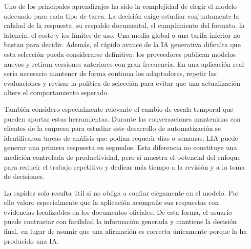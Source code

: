 Uno de los principales aprendizajes ha sido la complejidad de elegir el modelo
adecuado para cada tipo de tarea. La decisión exige estudiar conjuntamente la
calidad de la respuesta, su respaldo documental, el cumplimiento del formato,
la latencia, el coste y los límites de uso. Una media global o una tarifa
inferior no bastan para decidir. Además, el rápido avance de la IA generativa
dificulta que esta selección pueda considerarse definitiva: los proveedores
publican modelos nuevos y retiran versiones anteriores con gran frecuencia.
En una aplicación real sería necesario mantener de forma continua los
adaptadores, repetir las evaluaciones y revisar la política de selección para
evitar que una actualización altere el comportamiento esperado.

También considero especialmente relevante el cambio de escala temporal que
pueden aportar estas herramientas. Durante las conversaciones mantenidas con
clientes de la empresa para estudiar este desarrollo de automatización se
identificaron tareas de análisis que podían requerir días o semanas. LIA puede
generar una primera respuesta en segundos. Esta diferencia no constituye una
medición controlada de productividad, pero sí muestra el potencial del enfoque
para reducir el trabajo repetitivo y dedicar más tiempo a la revisión y a la
toma de decisiones.

La rapidez solo resulta útil si no obliga a confiar ciegamente en el modelo.
Por ello valoro especialmente que la aplicación acompañe sus respuestas con
evidencias localizables en los documentos oficiales. De esta forma, el usuario
puede contrastar con facilidad la información generada y mantiene la decisión
final, en lugar de asumir que una afirmación es correcta únicamente porque la
ha producido una IA.